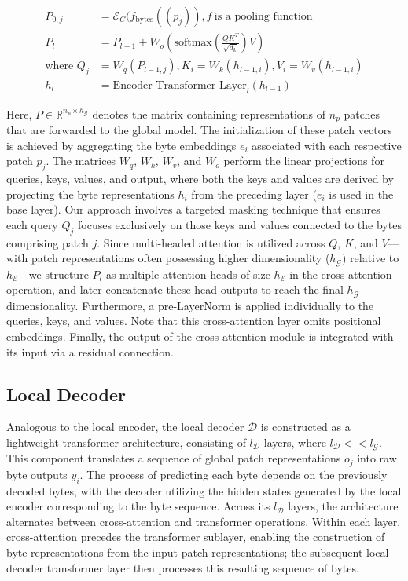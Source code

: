 \begin{align}
P_{0,j} &= \mathcal{E}_{C}(f_\text{bytes}((p_j)), f~ \text{is a pooling function} \\
P_l &= P_{l-1} + W_o\left(\text{softmax}\left(\frac{QK^T}{\sqrt{d_k}}\right)V\right) \\
\text{where } Q_j &= W_q(P_{l-1,j}), K_i = W_k(h_{l-1,i}), V_i = W_v(h_{l-1,i}) \\
h_l &= \text{Encoder-Transformer-Layer}_l(h_{l-1})
\end{align}

Here, $P \in \mathbb{R}^{n_p \times h_{\mathcal{G}}}$ denotes the matrix containing representations of $n_p$ patches that are forwarded to the global model. The initialization of these patch vectors is achieved by aggregating the byte embeddings $e_i$ associated with each respective patch $p_j$. The matrices $W_q$, $W_k$, $W_v$, and $W_o$ perform the linear projections for queries, keys, values, and output, where both the keys and values are derived by projecting the byte representations $h_i$ from the preceding layer ($e_i$ is used in the base layer). Our approach involves a targeted masking technique that ensures each query $Q_j$ focuses exclusively on those keys and values connected to the bytes comprising patch $j$. Since multi-headed attention is utilized across $Q$, $K$, and $V$—with patch representations often possessing higher dimensionality ($h_{\mathcal{G}}$) relative to $h_{\mathcal{E}}$—we structure $P_l$ as multiple attention heads of size $h_{\mathcal{E}}$ in the cross-attention operation, and later concatenate these head outputs to reach the final $h_{\mathcal{G}}$ dimensionality. Furthermore, a pre-LayerNorm is applied individually to the queries, keys, and values. Note that this cross-attention layer omits positional embeddings. Finally, the output of the cross-attention module is integrated with its input via a residual connection.

\subsection{Local Decoder} 

Analogous to the local encoder, the local decoder $\mathcal{D}$ is constructed as a lightweight transformer architecture, consisting of $l_{\mathcal{D}}$ layers, where $l_{\mathcal{D}} << l_{\mathcal{G}}$. This component translates a sequence of global patch representations $o_j$ into raw byte outputs $y_i$. The process of predicting each byte depends on the previously decoded bytes, with the decoder utilizing the hidden states generated by the local encoder corresponding to the byte sequence. Across its $l_{\mathcal{D}}$ layers, the architecture alternates between cross-attention and transformer operations. Within each layer, cross-attention precedes the transformer sublayer, enabling the construction of byte representations from the input patch representations; the subsequent local decoder transformer layer then processes this resulting sequence of bytes.

